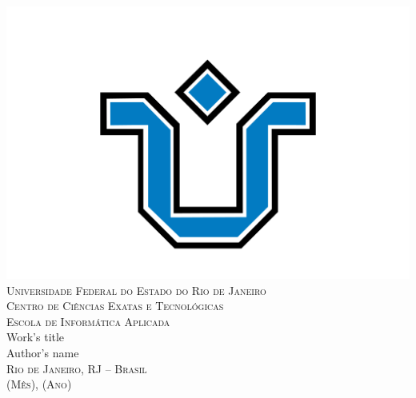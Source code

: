 \documentclass[a4paper, 12pt]{article}
\begin{document}
\setcounter{page}{1}
\thispagestyle{empty}
    \begin{center}
        \includegraphics[scale=0.18]{images/unirio.png}\\
        \fontsize{13}{15}
        \textsc{
        Universidade Federal do Estado do Rio de Janeiro\\
        Centro de Ciências Exatas e Tecnológicas\\
        Escola de Informática Aplicada\\}
        \vspace{2.8cm}
        Work's title\\
            
        \vspace{2.8cm}
        Author's name
        \vspace*{\fill}\\
        
        \textsc{Rio de Janeiro, RJ -- Brasil\\
        (Mês), (Ano)}
    \end{center}
    \clearpage
\end{document}
